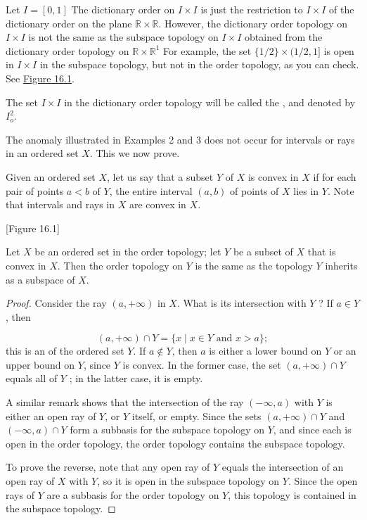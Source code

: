 \begin{centeredblock}
\begin{example}
\label{ex:\thesection.\theexample}
 Let \(I = [ {0,1}]\) The dictionary order on \(I \times I\) is just the restriction to \(I \times I\) of the dictionary order on the plane \(\mathbb{R} \times \mathbb{R}\). However, the dictionary order topology on \(I \times I\) is not the same as the subspace topology on \(I \times I\) obtained from the dictionary order topology on \(\mathbb{R} \times {\mathbb{R}}^{1}\) For example, the set \(\{ 1/2\} \times (1/2,1\rbrack\) is open in \(I \times I\) in the subspace topology, but not in the order topology, as you can check. See \hyperref[fig:16.1]{Figure 16.1}.

 The set \(I \times I\) in the dictionary order topology will be called the , and denoted by \( I_o^{2}\).
\end{example}
\end{centeredblock}

The anomaly illustrated in Examples 2 and 3 does not occur for intervals or rays in an ordered set \(X\). This we now prove.

Given an ordered set \(X\), let us say that a subset \(Y\) of \(X\) is convex in \(X\) if for each pair of points \(a < b\) of \(Y\), the entire interval \((a, b)\) of points of \(X\) lies in \(Y\). Note that intervals and rays in \(X\) are convex in \(X\).

[Figure 16.1]
\begin{theorem}
\label{thm:\thetheorem}
 Let \(X\) be an ordered set in the order topology; let \(Y\) be a subset of \(X\) that is convex in \(X\). Then the order topology on \(Y\) is the same as the topology \(Y\) inherits as a subspace of \(X\).
\end{theorem}

\begin{proof}
 Consider the ray \(( {a, + \infty })\) in \(X\). What is its intersection with \(Y\) ? If \(a \in Y\), then

 \[
 ( {a, + \infty }) \cap Y = \{ x \mid x \in Y\text{ and }x > a\} ;
 \]
 this is an  of the ordered set \(Y\). If \(a \notin Y\), then \(a\) is either a lower bound on \(Y\) or an upper bound on \(Y\), since \(Y\) is convex. In the former case, the set \(( {a, + \infty }) \cap Y\) equals all of \(Y\) ; in the latter case, it is empty.

 A similar remark shows that the intersection of the ray \(( {-\infty,a})\) with \(Y\) is either an open ray of \(Y\), or \(Y\) itself, or empty. Since the sets \(( {a, + \infty }) \cap Y\) and \(( {-\infty,a}) \cap Y\) form a subbasis for the subspace topology on \(Y\), and since each is open in the order topology, the order topology contains the subspace topology.

 To prove the reverse, note that any open ray of \(Y\) equals the intersection of an open ray of \(X\) with \(Y\), so it is open in the subspace topology on \(Y\). Since the open rays of \(Y\) are a subbasis for the order topology on \(Y\), this topology is contained in the subspace topology.
\end{proof}

